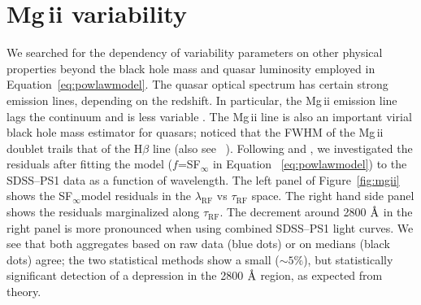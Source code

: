\documentclass[twocolumn]{aastex62}
\let\oldAA\AA
\renewcommand{\AA}{\text{\normalfont\oldAA}}
\begin{document}
\begin{figure*} 
	\caption{Outliers in the space of the recovered DRW parameters between SDSS and SDSS--PS1, as well as median offsets. Page 1/4 (continued on Figure~\ref{fig:clqso2}).}
	\label{fig:clqso1}
\end{figure*}

\begin{figure*}
\caption{As Figure~\ref{fig:clqso1}, page 2/4 (continued on Figure~\ref{fig:clqso3}). }
\label{fig:clqso2}
\end{figure*}


\begin{figure*}
\caption{As Figure~\ref{fig:clqso1}, page 3/4 (continued on Figure~\ref{fig:clqso4}). }
\label{fig:clqso3}
\end{figure*}

\begin{figure*}
\caption{As Figure~\ref{fig:clqso1}, page 4/4. }
\label{fig:clqso4}
\end{figure*}





\section{Mg\,{\sc ii} variability}
\label{app:mgii_variability}
We searched for the dependency of variability parameters on other physical properties beyond the black hole mass and quasar luminosity employed in Equation~\ref{eq:powlawmodel}. The quasar optical spectrum has certain strong emission lines, depending on the redshift. In particular, the Mg\,{\sc ii} emission line lags the continuum and is less variable \citep{reichert1994}. The Mg\,{\sc ii} line  is also an important virial black hole mass estimator for quasars; \cite{mclure2002} noticed that the FWHM of the Mg\,{\sc ii} doublet trails that of the  H$\beta$ line (also see ~\citealt{shen2013}). Following  \cite{ivezic2004} and \cite{macleod2012},  we investigated the residuals after fitting the model ($f$=SF$_{\infty}$ in Equation ~\ref{eq:powlawmodel}) to the SDSS--PS1 data as a function of wavelength. The left panel of Figure~\ref{fig:mgii} shows the SF$_{\infty}$model residuals in the $\lambda_{\mathrm{RF}}$ vs $\tau_{\mathrm{RF}}$ space. The right hand side panel shows the residuals marginalized along $\tau_{\mathrm{RF}}$. The decrement around 2800 $\mbox{\AA}$ in the right panel is more pronounced when using combined SDSS--PS1 light curves. We see that both aggregates based on raw data (blue dots) or on medians (black dots) agree; the two statistical methods show a small (${\sim}5\%$), but statistically significant detection of a depression in the 2800 $\mbox{\AA}$  region, as expected from theory.
\end{document}
